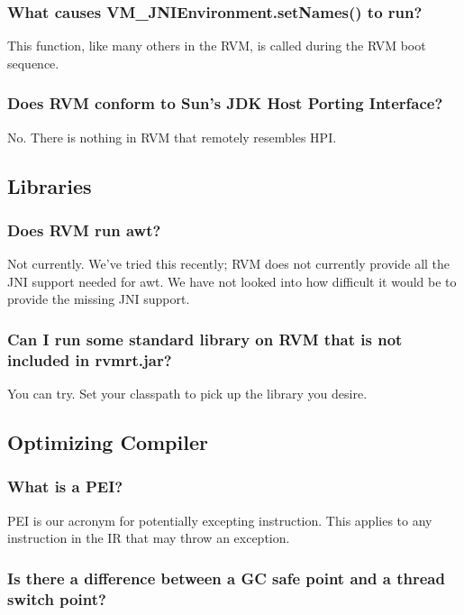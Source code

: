 \subsubsection{What causes VM\_JNIEnvironment.setNames() to run?}
This function, like many others in the RVM, is called during the RVM boot
sequence.

\subsubsection{Does RVM conform to Sun's JDK Host Porting Interface?}

No. There is nothing in RVM that remotely resembles HPI.

\subsection{Libraries}

\subsubsection{Does RVM run awt?}

Not currently.  We've tried this recently; RVM does not currently provide
all the JNI support needed for awt.  We have not looked into how difficult
it would be to provide the missing JNI support.

\subsubsection{Can I run some standard library on RVM that is not included
in rvmrt.jar?}

You can try.  Set your classpath to pick up the library you desire.

\subsection{Optimizing Compiler}

\subsubsection{What is a PEI?}
PEI is our acronym for potentially excepting instruction.  This applies to
any instruction in the IR that may throw an exception.


\subsubsection{Is there a difference between a GC safe point and a thread
switch point?}

